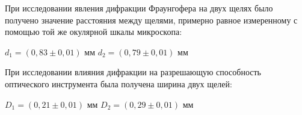 \documentclass[a4paper,12pt]{report}
\begin{document}
При исследовании явления дифракции Фраунгофера на двух щелях было получено значение расстояния между щелями, примерно равное измеренному с помощью той же окулярной шкалы микроскопа:
    
\begin{center}
$d_1 = (0,83\pm 0,01)$ мм \hspace{1cm} $d_2 = (0,79 \pm 0,01)$ мм
\end{center}

При исследовании влияния дифракции на разрешающую способность оптического инструмента была получена ширина двух щелей:

\begin{center}
$D_1 = (0,21\pm 0,01)$ мм \hspace{1cm} $D_2 = (0,29 \pm 0,01)$ мм
\end{center}
	
\end{document}
